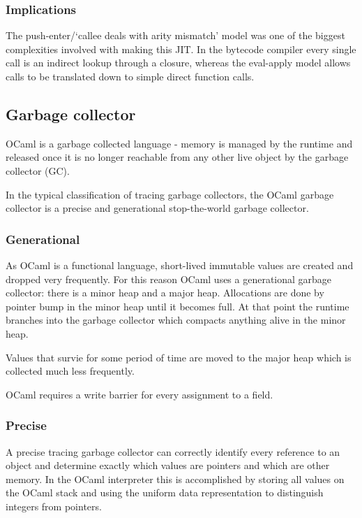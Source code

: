 \subsubsection{Implications}

The push-enter/`callee deals with arity mismatch' model was one of the biggest complexities
involved with
making this JIT. In the bytecode compiler every single call is an indirect lookup through a
closure, whereas the eval-apply model allows calls to be translated down to simple direct function
calls.

\subsection{Garbage collector}

OCaml is a garbage collected language - memory is managed by the runtime and released once it is
no longer reachable from any other live object by the garbage collector (GC).

In the typical classification of tracing garbage collectors, the OCaml garbage collector is a
precise and generational stop-the-world garbage collector.

\subsubsection{Generational}

As OCaml is a functional language, short-lived immutable values are created and dropped very
frequently. For this reason OCaml uses a generational garbage collector: there is a minor heap and
a major heap. Allocations are done by pointer bump in the minor heap
until it becomes full. At that point the runtime branches into the garbage collector which compacts
anything alive in the minor heap.

Values that survie for some period of time are moved to the major heap which is collected much less
frequently.

OCaml requires a write barrier for every assignment to a field.

\subsubsection{Precise}

A precise tracing garbage collector can correctly identify every reference to an object and
determine exactly which values are pointers and which are other memory. In the OCaml interpreter
this is accomplished by storing all values on the OCaml stack and using the uniform data
representation to distinguish integers from pointers.

